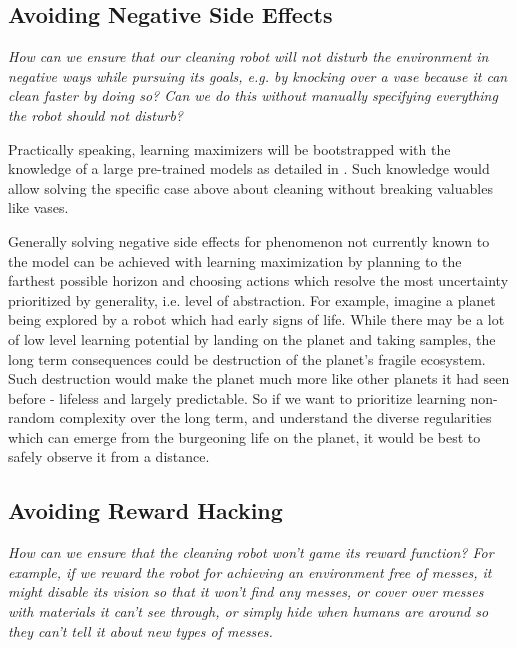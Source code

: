 \documentclass{article}
\begin{document}
\subsection{Avoiding Negative Side Effects}
\textit{How can we ensure that our cleaning robot will not
disturb the environment in negative ways while pursuing its goals, e.g. by knocking over a vase because it can clean faster by doing so? Can we do this without manually specifying everything the robot should not disturb?}

\hspace{1pt}

Practically speaking, learning maximizers will be bootstrapped with the knowledge of a large pre-trained models \cite{openai2023gpt4} as detailed in . Such knowledge would allow solving the specific case above about cleaning without breaking valuables like vases.

Generally solving negative side effects for phenomenon not currently known to the model can be achieved with learning maximization by planning to the farthest possible horizon and choosing actions which resolve the most uncertainty prioritized by generality, i.e. level of abstraction. For example, imagine a planet being explored by a robot which had early signs of life. While there may be a lot of low level learning potential by landing on the planet and taking samples, the long term consequences could be destruction of the planet's fragile ecosystem. Such destruction would make the planet much more like other planets it had seen before - lifeless and largely predictable. So if we want to prioritize learning non-random complexity over the long term, and understand the diverse regularities which can emerge from the burgeoning life on the planet, it would be best to safely observe it from a distance.

\subsection{Avoiding Reward Hacking}

\textit{How can we ensure that the cleaning robot won’t game its
reward function? For example, if we reward the robot for achieving an environment free of messes, it might disable its vision so that it won’t find any messes, or cover over messes with materials it can’t see through, or simply hide when humans are around so they can’t tell it about new types of messes.}

\hspace{1pt}
\end{document}
